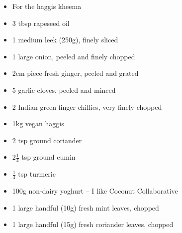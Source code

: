 \documentclass{book}
\begin{document}
\begin{itemize}
\item For the haggis kheema 
\item 3 tbsp rapeseed oil
\item 1 medium leek (250g), finely sliced
\item 1 large onion, peeled and finely chopped
\item 2cm piece fresh ginger, peeled and grated
\item 5 garlic cloves, peeled and minced
\item 2 Indian green finger chillies, very finely chopped
\item 1kg vegan haggis
\item 2 tsp ground coriander
\item 2$\frac{1}{4}$ tsp ground cumin
\item $\frac{1}{4}$ tsp turmeric
\item 100g non-dairy yoghurt – I like Coconut Collaborative
\item 1 large handful (10g) fresh mint leaves, chopped
\item 1 large handful (15g) fresh coriander leaves, chopped
\end{itemize}
\end{document}
